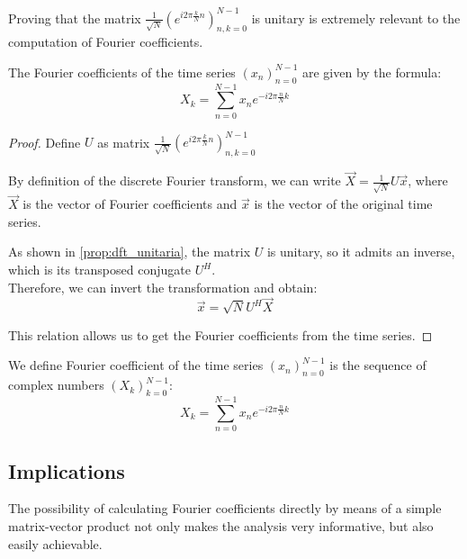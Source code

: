 \bigskip
Proving that the matrix $\frac{1}{\sqrt{N}}(e^{i2\pi\frac{k}{N}n})_{n,k=0}^{N-1}$ is unitary is extremely relevant to the computation of Fourier coefficients.
\begin{theorem}
	The Fourier coefficients of the time series $(x_n)_{n=0}^{N-1}$ are given by the formula:
	\begin{equation}
		X_k = \sum_{n=0}^{N-1} x_n e^{-i2\pi\frac{n}{N}k}
	\end{equation}
	\begin{proof}
		Define $U$ as matrix $\frac{1}{\sqrt{N}}(e^{i2\pi\frac{k}{N}n})_{n,k=0}^{N-1}$

		\noindent By definition of the discrete Fourier transform, we can write $\vec{X} = \frac{1}{\sqrt{N}}U\vec{x}$, where $\vec{X}$ is the vector of Fourier coefficients and $\vec{x}$ is the vector of the original time series.

		\noindent As shown in \cref{prop:dft_unitaria}, the matrix $U$ is unitary, so it admits an inverse, which is its transposed conjugate $U^H$. \\
		Therefore, we can invert the transformation and obtain:
		\[
			\vec{x} = \sqrt{N}U^H\vec{X}
		\]

		\noindent This relation allows us to get the Fourier coefficients from the time series.
	\end{proof}
\end{theorem}

\begin{definition}
	We define Fourier coefficient of the time series $(x_n)^{N-1}_{n=0}$ is the sequence of complex numbers $(X_k)^{N-1}_{k=0}$:
	\[
		X_k = \sum_{n=0}^{N-1} x_n e^{-i2\pi\frac{n}{N}k}
	\]
\end{definition}

\subsection{Implications}
The possibility of calculating Fourier coefficients directly by means of a simple matrix-vector product not only makes the analysis very informative, but also easily achievable.


